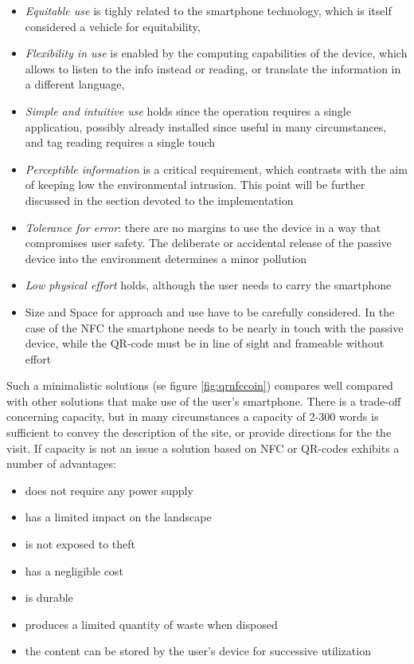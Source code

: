 \documentclass[sustainability,article,submit,pdftex,moreauthors]{Definitions/mdpi}
\begin{document}

\begin{itemize}
	\item {\em Equitable use} is tighly related to the smartphone technology, which is itself considered a vehicle for equitability,
	\item {\em Flexibility in use} is enabled by the computing capabilities of the device, which allows to listen to the info instead or reading, or translate the information in a different language,
	\item {\em Simple and intuitive use} holds since the operation requires a single application, possibly already installed since useful in many circumstances, and tag reading requires a single touch
	\item{\em Perceptible information} is a critical requirement, which contrasts with the aim of keeping low the environmental intrusion. This point will be further discussed in the section devoted to the implementation
	\item{\em Tolerance for error}: there are no margins to use the device in a way that compromises user safety. The deliberate or accidental release of the passive device into the environment determines a minor pollution
	\item{\em Low physical effort} holds, although the user needs to carry the smartphone
	\item{Size and Space for approach and use} have to be carefully considered. In the case of the NFC the smartphone needs to be nearly in touch with the passive device, while the QR-code must be in line of sight and frameable without effort
\end{itemize}

Such a minimalistic solutions (se figure \ref{fig:qrnfccoin}) compares well compared with other solutions that make use of the user's smartphone. There is a trade-off concerning capacity, but in many circumstances a capacity of 2-300 words is sufficient to convey the description of the site, or provide directions for the the visit. If capacity is not an issue a solution based on NFC or QR-codes exhibits a number of advantages:
\begin{itemize} 
\item does not require any power supply
\item has a limited impact on the landscape
\item is not exposed to theft
\item has a negligible cost
\item is durable
\item produces a limited quantity of waste when disposed
\item the content can be stored by the user's device for successive utilization
\end{itemize}
\end{document}
